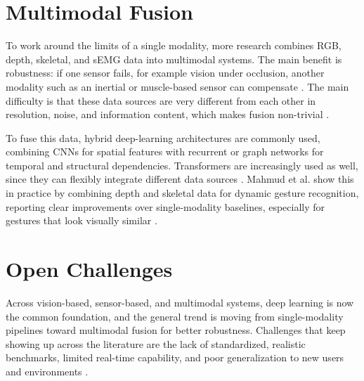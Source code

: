 \section{Multimodal Fusion}
To work around the limits of a single modality, more research combines RGB, depth, skeletal, and sEMG data into multimodal systems. The main benefit is robustness: if one sensor fails, for example vision under occlusion, another modality such as an inertial or muscle-based sensor can compensate \cite{wangComprehensiveSurveyMultimodal2026}. The main difficulty is that these data sources are very different from each other in resolution, noise, and information content, which makes fusion non-trivial \cite{shinMethodologicalStructuralReview2024}.
 
To fuse this data, hybrid deep-learning architectures are commonly used, combining CNNs for spatial features with recurrent or graph networks for temporal and structural dependencies. Transformers are increasingly used as well, since they can flexibly integrate different data sources \cite{wangComprehensiveSurveyMultimodal2026}. Mahmud et al. show this in practice by combining depth and skeletal data for dynamic gesture recognition, reporting clear improvements over single-modality baselines, especially for gestures that look visually similar \cite{mahmudDeepLearningbasedMultimodal2024}.
 
\section{Open Challenges}
Across vision-based, sensor-based, and multimodal systems, deep learning is now the common foundation, and the general trend is moving from single-modality pipelines toward multimodal fusion for better robustness. Challenges that keep showing up across the literature are the lack of standardized, realistic benchmarks, limited real-time capability, and poor generalization to new users and environments \cite{shinMethodologicalStructuralReview2024, wangComprehensiveSurveyMultimodal2026}.

